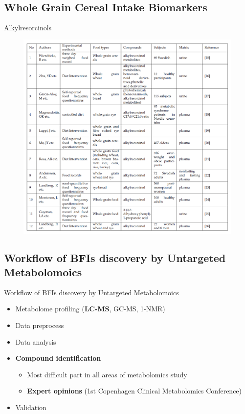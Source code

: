 \documentclass{beamer}
\begin{document}
\subsection{Whole Grain Cereal Intake Biomarkers}
\begin{frame}{Alkylresorcinols}
\begin{figure}[h]
    \centering
    \includegraphics[scale=0.32]{images/alkylresorcinols.png}
\end{figure}
\end{frame}

\subsection{Workflow of BFIs discovery by Untargeted Metabolomoics}
\begin{frame}{Workflow of BFIs discovery by Untargeted Metabolomoics}
\begin{itemize}
	\item Metabolome profiling (\textbf{LC-MS}, GC-MS, 1-NMR)
	\item Data preprocess
	\item Data analysis 
	\item<1-> \textbf{Compound identification}
		\begin{itemize}
			\item Most difficult part in all areas of metabolomics study
			\item \textbf{Expert opinions} (1st Copenhagen Clinical Metabolomics Conference) 
		\end {itemize}
	\item Validation
\end{itemize}
\end{frame}
\end{document}

